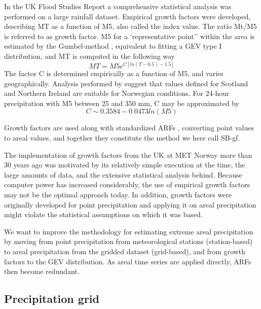 \documentclass[12pt,a4paper,english]{article}
\begin{document}
In the UK Flood Studies Report \citep{NERC1975} a comprehensive statistical analysis was performed on a large rainfall dataset. Empirical growth factors were developed, describing MT as a function of M5, also called the index value. The ratio Mt/M5 is referred to as growth factor. M5 for a `representative point'' within the area is estimated by the Gumbel-method \citep{Gumbel2004}, equivalent to fitting a GEV type I distribution, and MT is computed in the following way
\begin{equation}
MT=M5 e^{C[ln(T-0.5)-1.5]}
\end{equation}
The factor C is determined empirically as a function of M5, and varies geographically. Analysis performed by \cite{Forland1987} suggest that values defined for Scotland and Northern Ireland are suitable for Norwegian conditions. For 24-hour precipitation with M5 between 25 and 350 mm, C may be approximated by
\begin{equation}
C \sim0.3584 - 0.0473 ln(M5)
\end{equation}

\noindent Growth factors are used along with standardized ARFs \citep{NERC1975,Bell1976}, converting point values to areal values, and together they constitute the method we here call SB-gf. 

The implementation of growth factors from the UK \citep{NERC1975} at MET Norway more than 30 years ago was motivated by its relatively simple execution at the time, the large amounts of data, and the extensive statistical analysis behind. Because computer power has increased considerably, the use of empirical growth factors may not be the optimal approach today. In addition, growth factors were originally developed for point precipitation and applying it on areal precipitation might violate the statistical assumptions on which it was based.

We want to improve the methodology for estimating extreme areal precipitation by moving from point precipitation from meteorological stations (station-based) to areal precipitation from the gridded dataset (grid-based), and from growth factors to the GEV distribution. As areal time series are applied directly, ARFs then become redundant.

\subsection{Precipitation grid}
\end{document}
